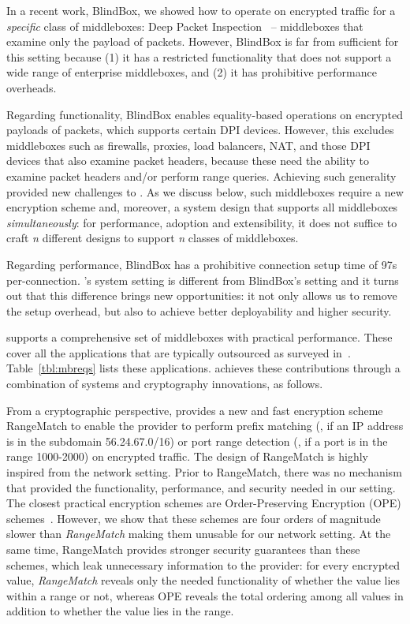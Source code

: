 In a recent work, BlindBox, we showed how to operate on encrypted traffic for a {\em specific} class of middleboxes: Deep Packet Inspection~\cite{blindbox} -- middleboxes that examine only the payload of packets. 
However, BlindBox is far from sufficient for this setting because
 (1) it has a restricted functionality that does not support a wide range of enterprise middleboxes, and (2) it has prohibitive performance overheads.
 
 Regarding functionality, BlindBox enables equality-based operations on  encrypted payloads of packets, which supports certain DPI devices. However, this excludes middleboxes such as firewalls, proxies, load balancers, NAT,  and those DPI devices that also examine packet headers, because these need the ability to examine packet headers and/or perform range queries. 
 Achieving such generality provided new challenges to \sys. 
As we discuss below, such middleboxes require a new encryption scheme and, moreover, a system design that supports all middleboxes {\it simultaneously}: for performance, adoption and extensibility, it does not suffice to craft {\it n} different designs to support {\it n} classes of middleboxes. 

 
Regarding performance, BlindBox has a prohibitive connection setup time of 97s per-connection. 
\sys's system setting is different from BlindBox's setting and it turns out that this difference brings new opportunities: it
not only allows us to remove the setup overhead, but also to achieve better deployability and higher security. 

   \sys supports a comprehensive set of middleboxes with practical performance. These cover all the applications that are typically outsourced as surveyed in~\cite{aplomb}. Table~\ref{tbl:mbreqs} lists these applications. 
   \sys achieves these contributions through a combination of systems and cryptography innovations, as follows.
   
   From a cryptographic perspective, \sys provides a new and fast encryption scheme RangeMatch  to enable the provider to perform prefix matching (\eg{}, if an IP address is in the subdomain 56.24.67.0/16) or port range detection (\eg{}, if a port is in the range 1000-2000) on encrypted traffic. The design of RangeMatch is highly inspired from the network setting.
 Prior to RangeMatch, there was no mechanism that provided the functionality, performance, and  security needed in our setting. The closest practical encryption schemes are Order-Preserving Encryption (OPE) schemes~\cite{boldyreva:ope,popa:mope,popa:cryptdb}. 
However, we show that these schemes are four orders of magnitude slower than {\it RangeMatch} making them unusable for our network setting. At the same time, RangeMatch provides stronger security guarantees than these schemes, which leak unnecessary information to the provider: for every encrypted value, {\em RangeMatch} reveals only the needed functionality of whether the value lies within a range or not, whereas OPE reveals the total ordering among all values in addition to whether the value lies in the range.

